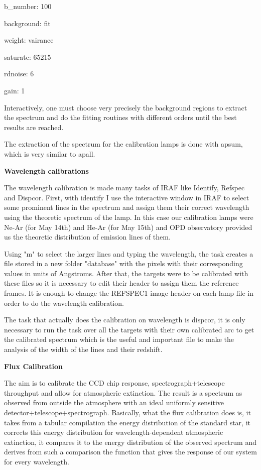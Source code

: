 \documentclass[english]{article}
\begin{document}
b\_number: 100

background: fit

weight: vairance

saturate: 65215

rdnoise: 6

gain: 1

Interactively, one must choose very precisely the background regions to extract the spectrum and do the fitting routines with different orders until the best results are reached.

The extraction of the spectrum for the calibration lamps is done with apsum, which is very similar to apall.

\textbf{Wavelength calibrations}

The wavelength calibration is made many tasks of IRAF like Identify, Refspec and Dispcor. First, with identify I use the interactive window in IRAF to select some prominent lines in the spectrum and assign them their correct wavelength using the theoretic spectrum of the lamp. In this case our calibration lamps were Ne-Ar (for May 14th) and He-Ar (for May 15th)  and OPD observatory provided us the theoretic distribution of emission lines of them.

Using "m" to select the larger lines and typing the wavelength, the task creates a file stored in a new folder "database" with the pixels with their corresponding values in units of Angstroms. After that, the targets were to be calibrated with these files so it is necessary to edit their header to assign them the reference frames. It is enough to change the REFSPEC1 image header on each lamp file in order to do the wavelength calibration. 

The task that actually does the calibration on wavelength is dispcor, it is only necessary to run the task over all the targets with their own calibrated arc to get the calibrated spectrum which is the useful and important file to make the analysis of the width of the lines and their redshift.

\textbf{Flux Calibration}

The aim is to calibrate the CCD chip response, spectrograph+telescope throughput and allow for atmospheric extinction. The result is a spectrum as observed from outside the atmosphere with an ideal uniformly sensitive detector+telescope+spectrograph. Basically, what the flux calibration does is, it takes from a tabular compilation the energy distribution of the standard star, it corrects this energy distribution for wavelength-dependent atmospheric extinction, it compares it to the energy distribution of the observed spectrum and derives from such a comparison the function that gives the response of our system for every wavelength.
\end{document}
